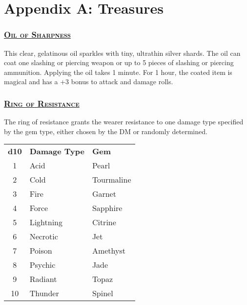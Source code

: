 \section{Appendix A: Treasures}

\begin{multicols*}{2}
	
\subsubsection*{\underline{\textsc{\Large Oil of Sharpness}}}
This clear, gelatinous oil sparkles with tiny, ultrathin silver shards. The oil can coat one slashing or piercing weapon or up to 5 pieces of slashing or piercing ammunition. Applying the oil takes 1 minute. For 1 hour, the coated item is magical and has a +3 bonus to attack and damage rolls.
	
\subsubsection*{\underline{\textsc{\Large Ring of Resistance}}}
The ring of resistance grants the wearer resistance to one damage type specified by the gem type, either chosen by the DM or randomly determined.

\begin{table}[H]
	\begin{tabular}{cll}
		\textbf{d10} & \textbf{Damage Type} & \textbf{Gem} \\
		1 & Acid & Pearl \\
		2 & Cold & Tourmaline \\
		3 & Fire & Garnet \\
		4 & Force & Sapphire \\
		5 & Lightning & Citrine \\
		6 & Necrotic & Jet \\
		7 & Poison & Amethyst \\
		8 & Psychic & Jade \\
		9 & Radiant & Topaz \\
		10 & Thunder & Spinel \\
	\end{tabular}
\end{table}


\end{multicols*}

\pagebreak